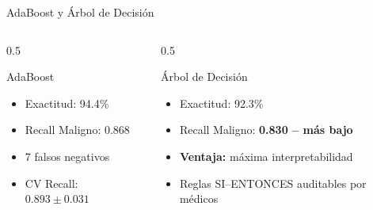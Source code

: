 \documentclass[10pt,aspectratio=169]{beamer}
\begin{document}
\begin{frame}{AdaBoost y Árbol de Decisión}
\begin{columns}
\begin{column}{0.5\textwidth}
\begin{block}{AdaBoost}
\begin{itemize}
  \item Exactitud: 94.4\%
  \item Recall Maligno: 0.868
  \item 7 falsos negativos
  \item CV Recall: $0.893 \pm 0.031$
\end{itemize}
\end{block}
\end{column}

\begin{column}{0.5\textwidth}
\begin{alertblock}{Árbol de Decisión}
\begin{itemize}
  \item Exactitud: 92.3\%
  \item Recall Maligno: \textbf{0.830 -- más bajo}
  \item \textbf{Ventaja:} máxima interpretabilidad
  \item Reglas SI--ENTONCES auditables por médicos
\end{itemize}
\end{alertblock}
\end{column}
\end{columns}
\end{frame}
\end{document}
